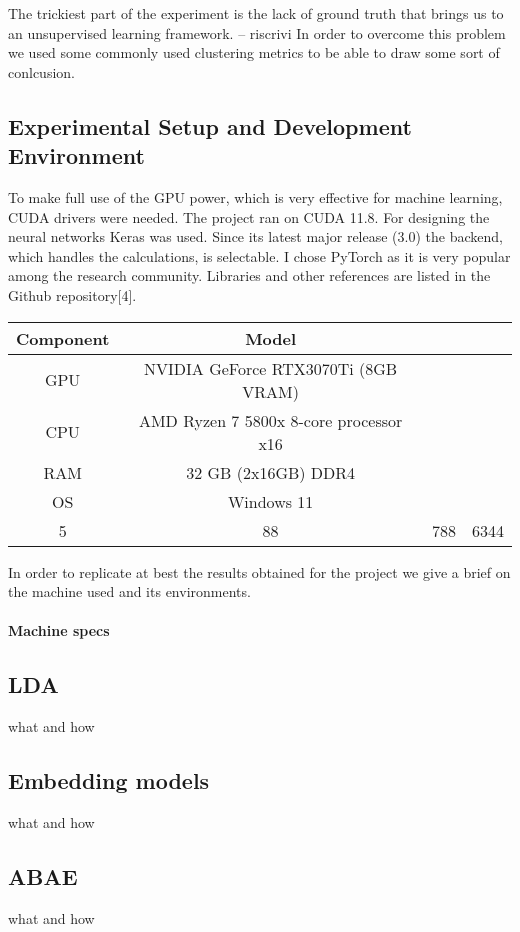The trickiest part of the experiment is the lack of ground truth that brings us to an unsupervised learning framework.
-- riscrivi
In order to overcome this problem we used some commonly used clustering metrics to be able to draw some sort of conlcusion.

\subsection{Experimental Setup and Development Environment}
To make full use of the GPU power, which is very effective for machine learning, CUDA drivers were needed.
The project ran on CUDA 11.8.
For designing the neural networks Keras was used.
Since its latest major release (3.0) the backend, which handles the calculations, is selectable.
I chose PyTorch as it is very popular among the research community.
Libraries and other references are listed in the Github repository[4].

\begin{center}
    \begin{tabular}{||c c c c||}
        \hline
        Component & Model \\ [0.5ex]
        \hline\hline
        GPU & NVIDIA GeForce RTX3070Ti (8GB VRAM) \\
        \hline
        CPU & AMD Ryzen 7 5800x 8-core processor x16 \\
        \hline
        RAM & 32 GB (2x16GB) DDR4 \\
        \hline
        OS & Windows 11 \\
        \hline
        5 & 88 & 788 & 6344 \\ [1ex]
        \hline
    \end{tabular}
\end{center}

In order to replicate at best the results obtained for the project we give a brief
on the machine used and its environments.

\paragraph{Machine specs}

\subsection{LDA}
what and how

\subsection{Embedding models}
what and how

\subsection{ABAE}
what and how

